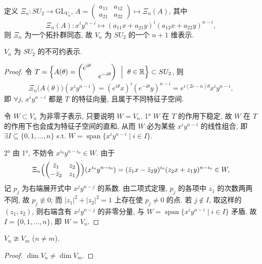 定义 $\Xi_n\colon SU_2\to\mathrm{GL}_{V_n}$, $A=\begin{pmatrix}a_{11}&a_{12}\\a_{21}&a_{22}\end{pmatrix}\mapsto\Xi_n(A)$,
其中
\[
  \Xi_n(A)\colon x^iy^{n-i}\longmapsto(a_{11}x+a_{21}y)^i(a_{12}x+a_{22}y)^{n-i},
\]
则 $\Xi_n$ 为一个拓扑群同态, 故 $V_n$ 为 $SU_2$ 的一个 $n+1$ 维表示.

\begin{theorem}\label{thm:Vn-irreducible}
$V_n$ 为 $SU_2$ 的不可约表示.
\end{theorem}

\begin{proof}
令 $T=\Bigl\{A(\theta)=\begin{pmatrix}e^{i\theta}&\\&e^{-i\theta}\end{pmatrix}\ \Bigm|\ \theta\in\mathbb{R}\Bigr\}\subset SU_2$,
则
\[
  \Xi_n\bigl(A(\theta)\bigr)(x^iy^{n-i})=(e^{i\theta}x)^i(e^{-i\theta}y)^{n-i}
  =e^{i(2i-n)\theta}x^iy^{n-i},
\]
即 $\forall j$, $x^iy^{n-i}$ 都是 $T$ 的特征向量, 且属于不同特征子空间.

令 $W\subset V_n$ 为非零子表示, 只要说明 $W=V_n$.
1° $W$ 在 $T$ 的作用下稳定, 故 $W$ 在 $T$ 的作用下也会成为特征子空间的直和,
从而 $W$ 必为某些 $x^iy^{n-i}$ 的线性组合, 即
$\exists I\subseteq\{0,1,\dots,n\}$ s.t. $W=\operatorname{span}\{x^iy^{n-i}\mid i\in I\}$.

2° 由 1°, 不妨令 $x^{i_0}y^{n-i_0}\in W$. 由于
\[
  \Xi_n\Bigl(\begin{pmatrix}\bar z_1&z_2\\-\bar z_2&z_1\end{pmatrix}\Bigr)(x^{i_0}y^{n-i_0})
  =(\bar z_1x-\bar z_2y)^{i_0}(z_2x+z_1y)^{n-i_0}\in W,
\]
记 $p_j$ 为右端展开式中 $x^jy^{n-j}$ 的系数. 由二项式定理, $p_j$ 的各项中 $z_1$ 的次数两两不同,
故 $p_j\not\equiv0$; 而 $|z_1|^2+|z_2|^2=1$ 上存在使 $p_j\neq0$ 的点.
若 $j\notin I$, 取这样的 $(z_1,z_2)$, 则右端含有 $x^jy^{n-j}$ 的非零分量,
与 $W=\operatorname{span}\{x^iy^{n-i}\mid i\in I\}$ 矛盾. 故 $I=\{0,1,\dots,n\}$, 即 $W=V_n$.
\end{proof}

\begin{lemma}\label{lem:Vn-inequivalent}
$V_n\ncong V_m$ ($n\ne m$).
\end{lemma}

\begin{proof}
$\dim V_n\ne\dim V_m$.
\end{proof}

